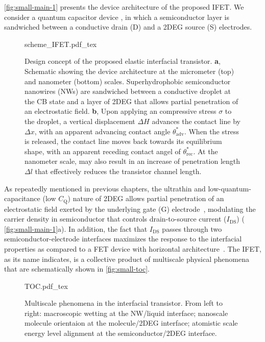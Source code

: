  \autoref{fig:small-main-1} presents the device architecture of the proposed
IFET. We consider a quantum capacitor device \cite{Luryi_1988_Quantum}, in which
a semiconductor layer is sandwiched between a conductive drain (D) and
a 2DEG source (S) electrodes.
%
\begin{figure}[htbp]
  \centering
  {scheme_IFET.pdf_tex}
  \caption{\label{fig:small-main-1} Design concept of the proposed
    elastic interfacial transistor. \textbf{a}, Schematic showing the device
    architecture at the micrometer (top) and nanometer (bottom)
    scales. Superhydrophobic semiconductor nanowires (NWs) are
    sandwiched between a conductive droplet at the CB state and a
    layer of 2DEG that allows partial penetration of an electrostatic
    field. \textbf{b}, Upon applying an compressive stress \(\sigma\) to the
    droplet, a vertical displacement \(\Delta H\) advances the contact
    line by \(\Delta x\), with an apparent advancing contact angle
    \(\theta_{\mathrm{adv}}^{*}\). When the stress is released, the
    contact line moves back towards its equilibrium shape, with an
    apparent receding contact angel of
    \(\theta_{\mathrm{rec}}^{*}\). At the nanometer scale, may also
    result in an increase of penetration length \(\Delta l\) that
    effectively reduces the transistor channel length.}
\end{figure}
%
%
As repeatedly mentioned in previous chapters, the ultrathin and
low-quantum-capacitance (low \(C_{\mathrm{Q}}\)) nature of 2DEG allows
partial penetration of an electrostatic field exerted by the
underlying gate (G) electrode~\cite{Shih_2015_PartiallyScreened},
modulating the carrier density in semiconductor that controls
drain-to-source current (\(I_{\mathrm{DS}}\)) (
\autoref{fig:small-main-1}a).
%
In addition, the fact that \(I_{\mathrm{DS}}\) passes through two
semiconductor-electrode interfaces maximizes the response to the
interfacial properties as compared to a FET device with horizontal
architecture~\cite{Ben_Sasson_2014_fet_rev}. The IFET, as its name
indicates, is a collective product of multiscale physical phenomena
that are schematically shown in \autoref{fig:small-toc}.
\begin{figure}[!htbp]
  \centering
  {TOC.pdf_tex}
  \caption{\label{fig:small-toc} Multiscale phenomena in the
    interfacial transistor. From left to right: macroscopic wetting at
    the NW/liquid interface; nanoscale molecule orientaion at the
    molecule/2DEG interface; atomistic scale energy level alignment at
    the semiconductor/2DEG interface.  }
\end{figure}


